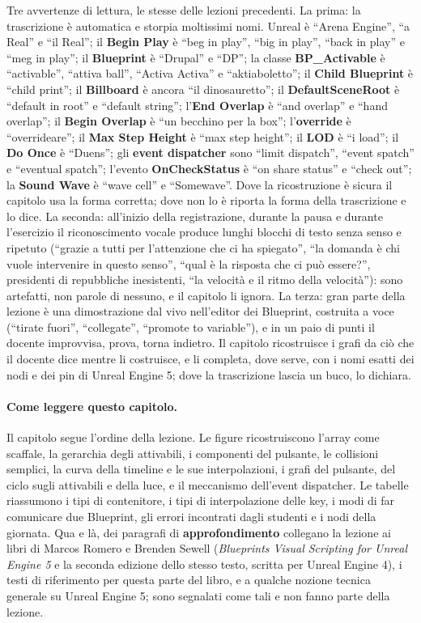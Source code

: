 Tre avvertenze di lettura, le stesse delle lezioni precedenti. La prima: la
trascrizione è automatica e storpia moltissimi nomi. Unreal è ``Arena Engine'', ``a
Real'' e ``il Real''; il \textbf{Begin Play} è ``beg in play'', ``big in play'', ``back
in play'' e ``meg in play''; il \textbf{Blueprint} è ``Drupal'' e ``DP''; la classe
\textbf{BP\_Activable} è ``activable'', ``attiva ball'', ``Activa Activa'' e
``aktiaboletto''; il \textbf{Child Blueprint} è ``child print''; il
\textbf{Billboard} è ancora ``il dinosauretto''; il \textbf{DefaultSceneRoot} è ``default
in root'' e ``default string''; l'\textbf{End Overlap} è ``and overlap'' e ``hand
overlap''; il \textbf{Begin Overlap} è ``un becchino per la box''; l'\textbf{override}
è ``overrideare''; il \textbf{Max Step Height} è ``max step height''; il \textbf{LOD} è
``i load''; il \textbf{Do Once} è ``Duens''; gli \textbf{event dispatcher} sono ``limit
dispatch'', ``event spatch'' e ``eventual spatch''; l'evento \textbf{OnCheckStatus} è
``on share status'' e ``check out''; la \textbf{Sound Wave} è ``wave cell'' e
``Somewave''. Dove la ricostruzione è sicura il capitolo usa la forma corretta; dove non
lo è riporta la forma della trascrizione e lo dice. La seconda: all'inizio della
registrazione, durante la pausa e durante l'esercizio il riconoscimento vocale produce
lunghi blocchi di testo senza senso e ripetuto (``grazie a tutti per l'attenzione che ci
ha spiegato'', ``la domanda è chi vuole intervenire in questo senso'', ``qual è la
risposta che ci può essere?'', presidenti di repubbliche inesistenti, ``la velocità e il
ritmo della velocità''): sono artefatti, non parole di nessuno, e il capitolo li ignora.
La terza: gran parte della lezione è una dimostrazione dal vivo nell'editor dei
Blueprint, costruita a voce (``tirate fuori'', ``collegate'', ``promote to variable''),
e in un paio di punti il docente improvvisa, prova, torna indietro. Il capitolo
ricostruisce i grafi da ciò che il docente dice mentre li costruisce, e li completa,
dove serve, con i nomi esatti dei nodi e dei pin di Unreal Engine 5; dove la
trascrizione lascia un buco, lo dichiara.

\paragraph{Come leggere questo capitolo.} Il capitolo segue l'ordine della lezione. Le
figure ricostruiscono l'array come scaffale, la gerarchia degli attivabili, i
componenti del pulsante, le collisioni semplici, la curva della timeline e le sue
interpolazioni, i grafi del pulsante, del ciclo sugli attivabili e della luce, e il
meccanismo dell'event dispatcher. Le tabelle riassumono i tipi di contenitore, i tipi di
interpolazione delle key, i modi di far comunicare due Blueprint, gli errori incontrati
dagli studenti e i nodi della giornata. Qua e là, dei paragrafi di
\textbf{approfondimento} collegano la lezione ai libri di Marcos Romero e Brenden Sewell
(\emph{Blueprints Visual Scripting for Unreal Engine 5} e la seconda edizione dello
stesso testo, scritta per Unreal Engine 4), i testi di riferimento per questa parte del
libro, e a qualche nozione tecnica generale su Unreal Engine 5; sono segnalati come tali
e non fanno parte della lezione.

